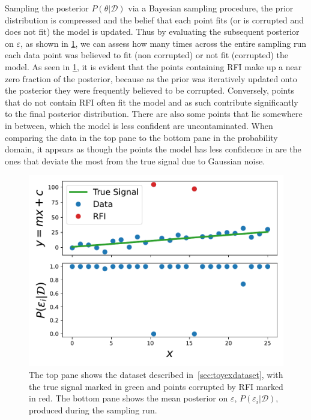 \documentclass[fleqn,usenatbib]{mnras}
\begin{document}
Sampling the posterior $P(\theta|\mathcal{D})$ via a Bayesian sampling procedure, the prior distribution is compressed and the belief that each point fits (or is corrupted and does not fit) the model is updated. Thus by evaluating the subsequent posterior on $\varepsilon$, as shown in \cref{fig:posterior_frac_toy}, we can assess how many times across the entire sampling run each data point was believed to fit (non corrupted) or not fit (corrupted) the model. As seen in \cref{fig:posterior_frac_toy}, it is evident that the points containing RFI make up a near zero fraction of the posterior, because as the prior was iteratively updated onto the posterior they were frequently believed to be corrupted. Conversely, points that do not contain RFI often fit the model and as such contribute significantly to the final posterior distribution. There are also some points that lie somewhere in between, which the model is less confident are uncontaminated. When comparing the data in the top pane to the bottom pane in the probability domain, it appears as though the points the model has less confidence in are the ones that deviate the most from the true signal due to Gaussian noise. 
\begin{figure}
	\includegraphics[width=\columnwidth]{f_test.pdf}
    \caption{The top pane shows the dataset described in~\cref{sec:toyexdataset}, with the true signal marked in green and points corrupted by RFI marked in red. The bottom pane shows the mean posterior on $\varepsilon$, $P(\varepsilon_i|\mathcal{D})$, produced during the sampling run.}
    \label{fig:posterior_frac_toy}
\end{figure}
\end{document}
